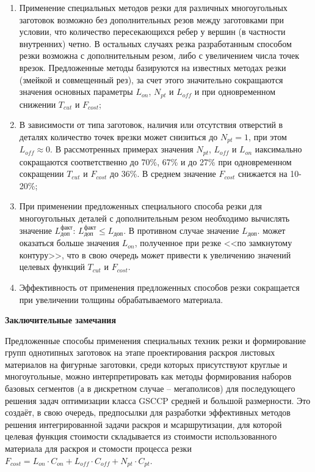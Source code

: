 \documentclass[11pt,twoside]{report}
\begin{document}
\begin{enumerate}
\item Применение специальных методов резки
для различных многоугольных заготовок возможно
без дополнительных резов между заготовками при условии,
что количество пересекающихся ребер у вершин
(в частности внутренних) четно.
В остальных случаях резка разработанным
способом резки возможна с дополнительным резом,
либо с увеличением числа точек врезок.
Предложенные методы базируются на известных методах резки
(змейкой и совмещенный рез),
за счет этого значительно сокращаются
значения основных параметры
$L_{on}$, $N_{pt}$  и $L_{off}$
и   при одновременном снижении
$T_{cut}$
и
$F_{cost}$;

\item В зависимости от типа заготовок,
наличия или отсутствия отверстий в деталях
количество точек врезки может снизиться до
$N_{pt}=1$,
при этом
$L_{off} \approx 0$.
В рассмотренных примерах значения
$N_{pt}$, $L_{off}$ и $L_{on}$
иаксимально сокращаются соответственно до 70\%, 67\% и до 27\%
при одновременном сокращении
$T_{cut}$
и
$F_{cost}$
до 36\%.
В среднем значение $F_{cost}$ снижается на 10-20\%;

\item При применении предложенных специального способа резки
для многоугольных деталей с дополнительным резом
необходимо вычислять значение
$L_\text{доп}^\text{факт}$:
$L_\text{доп}^\text{факт} \leqslant L_\text{доп}$.
В противном случае значение
$L_\text{доп}$.
может оказаться больше значения
$L_{on}$,
полученное при резке <<по замкнутому контуру>>,
что в свою очередь может привести к увеличению значений целевых функций
$T_{cut}$
и
$F_{cost}$.

\item Эффективность от применения предложенных способов резки
сокращается при увеличении толщины обрабатываемого материала.
\end{enumerate}

{\bf Заключительные замечания}

Предложенные способы применения специальных техник резки и
формирование групп однотипных заготовок на этапе
проектирования раскроя листовых материалов на фигурные заготовки,
среди которых присутствуют круглые и многоугольные,
можно интерпретировать как методы формирования наборов базовых сегментов
(а в дискретном случае – мегаполисов)
для последующего решения задач оптимизации класса GSCCP
средней и большой размерности.
Это создаёт, в свою очередь,
предпосылки  для разработки эффективных методов
решения интегрированной задачи раскроя и мсаршрутизации,
для которой целевая функция стоимости складывается
из стоимости использованного материала для раскроя
и стомости процесса резки
$
F_{cost}=
L_{on} \cdot C_{on} +
L_{off} \cdot C_{off} +
N_{pt} \cdot C_{pt}
$.
\end{document}

